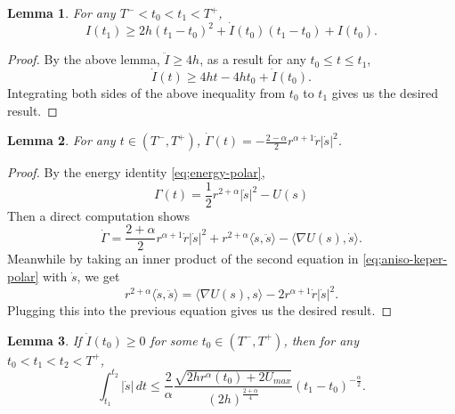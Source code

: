 \documentclass[11pt]{amsart}
\newcommand{\al}{\alpha}
\newcommand{\ey}{\frac{1}{2}}
\theoremstyle{plain}
\newtheorem{lem}{Lemma}[section]
\theoremstyle{definition}
\theoremstyle{remark}
\begin{document}
\begin{lem}
\label{lem;I-ge} For any $T^-<t_0< t_1 <T^+$, 
\begin{equation}
\label{eq;I-ge} I(t_1) \ge 2h(t_1 -t_0)^2 + \dot{I}(t_0)(t_1 -t_0) + I(t_0).  
\end{equation}
\end{lem}
\begin{proof}
By the above lemma, $\ddot{I} \ge 4h$, as a result for any $t_0 \le t \le t_1$, 
\begin{equation}
\label{eq;I-dot} \dot{I}(t) \ge 4ht - 4h t_0 + \dot{I}(t_0).
\end{equation}
Integrating both sides of the above inequality from $t_0$ to $t_1$ gives us the desired result. 
\end{proof}

\begin{lem}
\label{lem;Gamma-dot} For any $t \in (T^-, T^+)$, $\dot{\Gamma}(t) = -\frac{2 -\al}{2} r^{\al +1} \dot{r} |\dot{s}|^2$.
\end{lem}
\begin{proof}
By the energy identity \eqref{eq;energy-polar}, 
\begin{equation}
\label{eq;Gamma} \Gamma(t) = \ey r^{2 +\al} |\dot{s}|^2 - U(s) 
\end{equation}
Then a direct computation shows
$$ \dot{\Gamma} = \frac{2 +\al}{2} r^{\al +1} \dot{r} |\dot{s}|^2 + r^{2+\al} \langle \dot{s}, \ddot{s} \rangle - \langle \nabla U(s), \dot{s} \rangle. $$
Meanwhile by taking an inner product of the second equation in \eqref{eq;aniso-keper-polar} with $\dot{s}$, we get 
$$ r^{2 +\al} \langle \dot{s}, \ddot{s} \rangle = \langle \nabla U(s), s \rangle - 2 r^{\al +1} \dot{r} |\dot{s}|^2. $$
Plugging this into the previous equation gives us the desired result. 
\end{proof}

\begin{lem}
\label{lem;|s-dot|} If $\dot{I}(t_0) \ge 0$ for some $t_0 \in (T^-, T^+)$, then for any $t_0 < t_1 < t_2 < T^+$, 
\begin{equation}
\label{eq;int-s-dot} \int_{t_1}^{t_2} |\dot{s}| \,dt \le  \frac{2}{\al} \frac{\sqrt{2h r^{\al}(t_0)+2U_{max}}}{(2h )^{\frac{2 +\al}{4}}}(t_1-t_0)^{-\frac{\al}{2}} .
\end{equation}
\end{lem}
\end{document}
